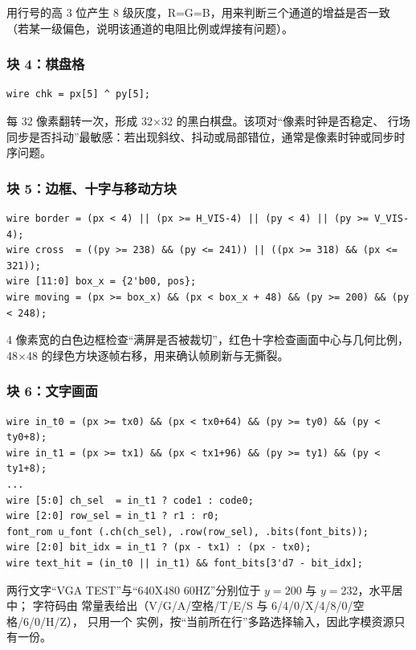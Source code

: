 用行号的高 3 位产生 8 级灰度，R=G=B，用来判断三个通道的增益是否一致
（若某一级偏色，说明该通道的电阻比例或焊接有问题）。

\subsubsection{块 4：棋盘格}

\begin{lstlisting}[style=vsnip]
wire chk = px[5] ^ py[5];
\end{lstlisting}

每 32 像素翻转一次，形成 32$\times$32 的黑白棋盘。该项对“像素时钟是否稳定、
行场同步是否抖动”最敏感：若出现斜纹、抖动或局部错位，通常是像素时钟或同步时序问题。

\subsubsection{块 5：边框、十字与移动方块}

\begin{lstlisting}[style=vsnip]
wire border = (px < 4) || (px >= H_VIS-4) || (py < 4) || (py >= V_VIS-4);
wire cross  = ((py >= 238) && (py <= 241)) || ((px >= 318) && (px <= 321));
wire [11:0] box_x = {2'b00, pos};
wire moving = (px >= box_x) && (px < box_x + 48) && (py >= 200) && (py < 248);
\end{lstlisting}

4 像素宽的白色边框检查“满屏是否被裁切”，红色十字检查画面中心与几何比例，
48$\times$48 的绿色方块逐帧右移，用来确认帧刷新与无撕裂。

\subsubsection{块 6：文字画面}

\begin{lstlisting}[style=vsnip]
wire in_t0 = (px >= tx0) && (px < tx0+64) && (py >= ty0) && (py < ty0+8);
wire in_t1 = (px >= tx1) && (px < tx1+96) && (py >= ty1) && (py < ty1+8);
...
wire [5:0] ch_sel  = in_t1 ? code1 : code0;
wire [2:0] row_sel = in_t1 ? r1 : r0;
font_rom u_font (.ch(ch_sel), .row(row_sel), .bits(font_bits));
wire [2:0] bit_idx = in_t1 ? (px - tx1) : (px - tx0);
wire text_hit = (in_t0 || in_t1) && font_bits[3'd7 - bit_idx];
\end{lstlisting}

两行文字“VGA TEST”与“640X480 60HZ”分别位于 $y=200$ 与 $y=232$，水平居中；
字符码由  常量表给出（V/G/A/空格/T/E/S 与 6/4/0/X/4/8/0/空格/6/0/H/Z），
只用一个  实例，按“当前所在行”多路选择输入，因此字模资源只有一份。

